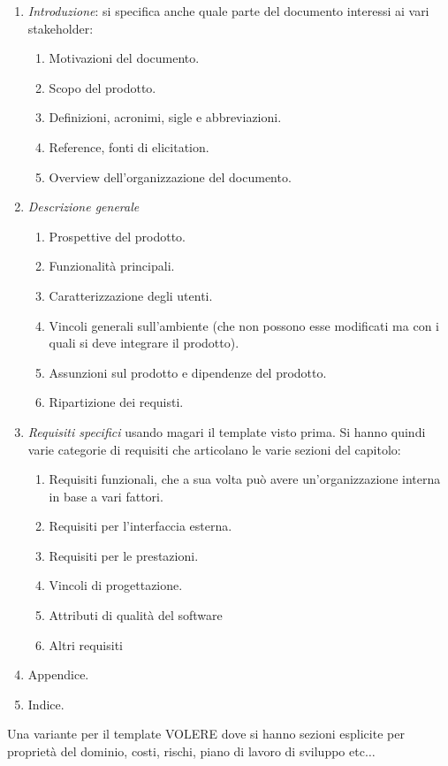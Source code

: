\begin{enumerate}
      \item \textit{Introduzione}: si specifica anche quale parte del documento
            interessi ai vari stakeholder:
            \begin{enumerate}
                  \item Motivazioni del documento.
                  \item Scopo del prodotto.
                  \item Definizioni, acronimi, sigle e abbreviazioni.
                  \item Reference, fonti di elicitation.
                  \item Overview dell'organizzazione del documento.
            \end{enumerate}
      \item \textit{Descrizione generale}
            \begin{enumerate}
                  \item Prospettive del prodotto.
                  \item Funzionalità principali.
                  \item Caratterizzazione degli utenti.
                  \item Vincoli generali sull'ambiente (che non possono esse
                        modificati ma con i quali si deve integrare il prodotto).
                  \item Assunzioni sul prodotto e dipendenze del prodotto.
                  \item Ripartizione dei requisti.
            \end{enumerate}
      \item \textit{Requisiti specifici} usando magari il template visto prima.
            Si hanno quindi varie categorie di requisiti che articolano le varie
            sezioni del capitolo:
            \begin{enumerate}
                  \item Requisiti funzionali, che a sua volta può avere
                        un'organizzazione interna in base a vari fattori.
                  \item Requisiti per l'interfaccia esterna.
                  \item Requisiti per le prestazioni.
                  \item Vincoli di progettazione.
                  \item Attributi di qualità del software
                  \item Altri requisiti
            \end{enumerate}
      \item Appendice.
      \item Indice.
\end{enumerate}
Una variante per il template VOLERE dove si hanno sezioni esplicite per proprietà
del dominio, costi, rischi, piano di lavoro di sviluppo etc$\dots$

